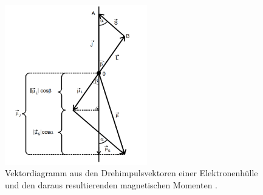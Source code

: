 \begin{figure}[H] 
    \centering
    \includegraphics[height=70mm]{bilder/Ab1.png}
    \caption{Vektordiagramm aus den Drehimpulsvektoren einer Elektronenhülle und den daraus resultierenden magnetischen Momenten \cite{a1}.\label{Abbildung1} }
\end{figure}

